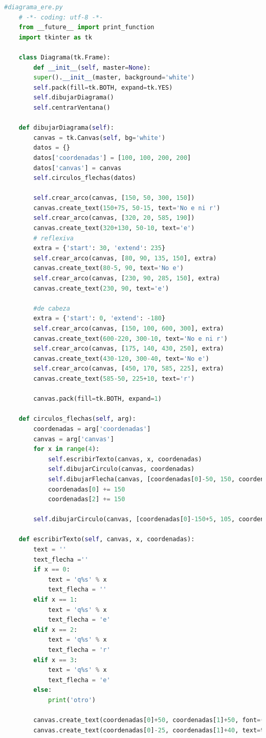 	\begin{lstlisting}[language=Python]
	#diagrama_ere.py
	# -*- coding: utf-8 -*-
	from __future__ import print_function
	import tkinter as tk
	
	class Diagrama(tk.Frame):
		def __init__(self, master=None):
		super().__init__(master, background='white')
		self.pack(fill=tk.BOTH, expand=tk.YES)
		self.dibujarDiagrama()
		self.centrarVentana()
	
	def dibujarDiagrama(self):
		canvas = tk.Canvas(self, bg='white')
		datos = {}
		datos['coordenadas'] = [100, 100, 200, 200]
		datos['canvas'] = canvas
		self.circulos_flechas(datos)
		
		self.crear_arco(canvas, [150, 50, 300, 150])
		canvas.create_text(150+75, 50-15, text='No e ni r')
		self.crear_arco(canvas, [320, 20, 585, 190])
		canvas.create_text(320+130, 50-10, text='e')
		# reflexiva
		extra = {'start': 30, 'extend': 235}
		self.crear_arco(canvas, [80, 90, 135, 150], extra)
		canvas.create_text(80-5, 90, text='No e')
		self.crear_arco(canvas, [230, 90, 285, 150], extra)
		canvas.create_text(230, 90, text='e')
		
		#de cabeza
		extra = {'start': 0, 'extend': -180}
		self.crear_arco(canvas, [150, 100, 600, 300], extra)
		canvas.create_text(600-220, 300-10, text='No e ni r')
		self.crear_arco(canvas, [175, 140, 430, 250], extra)
		canvas.create_text(430-120, 300-40, text='No e')
		self.crear_arco(canvas, [450, 170, 585, 225], extra)
		canvas.create_text(585-50, 225+10, text='r')
		
		canvas.pack(fill=tk.BOTH, expand=1)
	
	def circulos_flechas(self, arg):
		coordenadas = arg['coordenadas']
		canvas = arg['canvas']
		for x in range(4):
			self.escribirTexto(canvas, x, coordenadas)
			self.dibujarCirculo(canvas, coordenadas)
			self.dibujarFlecha(canvas, [coordenadas[0]-50, 150, coordenadas[2]-100, 150])
			coordenadas[0] += 150
			coordenadas[2] += 150
		
		self.dibujarCirculo(canvas, [coordenadas[0]-150+5, 105, coordenadas[2]-155, 195]) # circulo interior
	
	def escribirTexto(self, canvas, x, coordenadas):
		text = ''
		text_flecha =''
		if x == 0:
			text = 'q%s' % x
			text_flecha = ''
		elif x == 1:
			text = 'q%s' % x
			text_flecha = 'e'
		elif x == 2:
			text = 'q%s' % x
			text_flecha = 'r'
		elif x == 3:
			text = 'q%s' % x
			text_flecha = 'e'
		else:
			print('otro')
	
		canvas.create_text(coordenadas[0]+50, coordenadas[1]+50, font=('15'), text=text)
		canvas.create_text(coordenadas[0]-25, coordenadas[1]+40, text=text_flecha)
	

\end{lstlisting}
